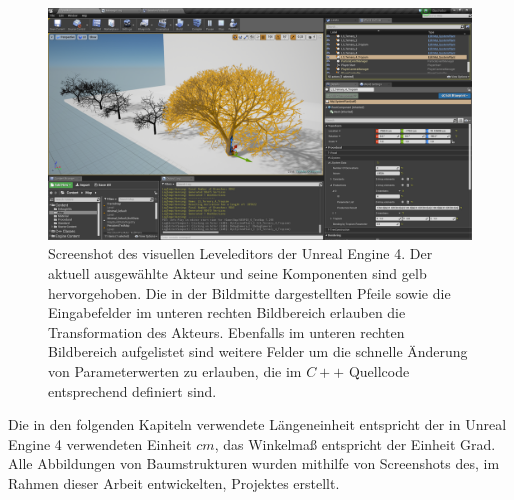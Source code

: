 \begin{figure} [ht]
	\centering
	\includegraphics[width=\textwidth]{images/ScreenshotUE4Editor.png}
	\caption{Screenshot des visuellen Leveleditors der Unreal Engine 4. Der aktuell ausgewählte Akteur und seine Komponenten sind gelb hervorgehoben. Die in der Bildmitte dargestellten Pfeile sowie die Eingabefelder im unteren rechten Bildbereich erlauben die Transformation des Akteurs. Ebenfalls im unteren rechten Bildbereich aufgelistet sind weitere Felder um die schnelle Änderung von Parameterwerten zu erlauben, die im $C++$ Quellcode entsprechend definiert sind. }
	\label{fig:ScreenshotUE4Editor}
\end{figure}


Die in den folgenden Kapiteln verwendete Längeneinheit entspricht der in Unreal Engine 4 verwendeten Einheit \grqq$cm$\grqq, das Winkelmaß entspricht der Einheit \glqq Grad\grqq. Alle Abbildungen von Baumstrukturen wurden mithilfe von Screenshots des, im Rahmen dieser Arbeit entwickelten, Projektes erstellt.